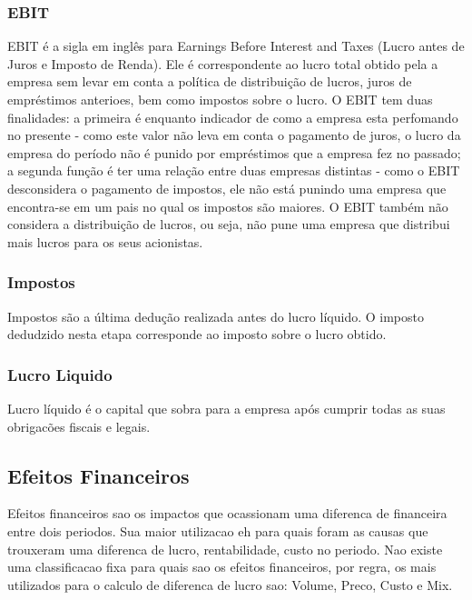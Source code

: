 \documentclass[12pt]{article}
\begin{document}
\subsubsection{EBIT}
EBIT é a sigla em inglês para Earnings Before Interest and Taxes (Lucro antes de Juros e Imposto de Renda). Ele é correspondente ao lucro total obtido pela a empresa sem levar em conta a política de distribuição de lucros, juros de empréstimos anterioes, bem como impostos sobre o lucro. O EBIT tem duas finalidades: a primeira é enquanto indicador de como a empresa esta perfomando no presente - como este valor não leva em conta o pagamento de juros, o lucro da empresa do período não é punido por empréstimos que a empresa fez no passado; a segunda função é ter uma relação entre duas empresas distintas - como o EBIT desconsidera o pagamento de impostos, ele não está punindo uma empresa que encontra-se em um pais no qual os impostos são maiores. O EBIT também não considera a distribuição de lucros, ou seja, não pune uma empresa que distribui mais lucros para os seus acionistas.

\subsubsection{Impostos}
Impostos são a última dedução realizada antes do lucro líquido. O imposto dedudzido nesta etapa corresponde ao imposto sobre o lucro obtido.

\subsubsection{Lucro Liquido}
Lucro líquido é o capital que sobra para a empresa após cumprir todas as suas obrigacões fiscais e legais.


\subsection{Efeitos Financeiros}
Efeitos financeiros sao os impactos que ocassionam uma diferenca de financeira entre dois periodos. Sua maior utilizacao eh para quais foram as causas que trouxeram uma diferenca de lucro, rentabilidade, custo no periodo. Nao existe uma classificacao fixa para quais sao os efeitos financeiros, por regra, os mais utilizados para o calculo de diferenca de lucro sao: Volume, Preco, Custo e Mix.
\end{document}
